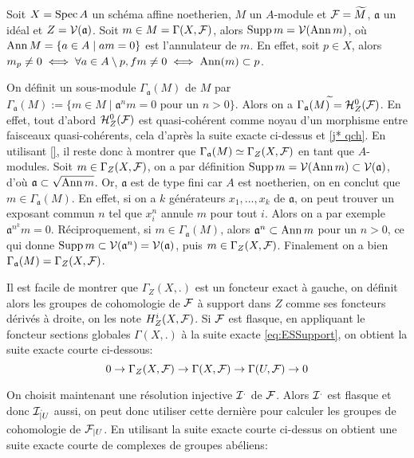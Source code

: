 \begin{ex}\label{cohomsupportaffineex}
Soit $X=\operatorname{Spec} A$ un schéma affine noetherien, $M$ un $A$-module et $\mathcal{F}=\widetilde{M}$, $\mathfrak{a}$ un idéal et $Z=\mathcal{V}(\mathfrak{a})$. Soit $m\in M=\Gamma(X,\mathcal{F})$, alors $\operatorname{Supp} m=\mathcal{V}(\operatorname{Ann} m)$, où $\operatorname{Ann} M=\lbrace a\in A\mid am=0\rbrace$ est l'annulateur de $m$. En effet, soit $p\in X$, alors $m_p\neq 0\iff \forall a\in A\setminus p, fm\neq 0\iff \operatorname{Ann}(m)\subset p$.

On définit un sous-module $\Gamma_\mathfrak{a}(M)$ de $M$ par $\Gamma_\mathfrak{a}(M):=\lbrace m\in M\mid \mathfrak{a}^nm=0 \text{ pour un } n>0 \rbrace$. Alors on a $\Gamma_\mathfrak{a}(M)^{\widetilde{}} = \mathcal{H} ^0 _Z(\mathcal{F})$. En effet, tout d'abord $\mathcal{H}^0 _Z(\mathcal{F})$ est quasi-cohérent comme noyau d'un morphisme entre faisceaux quasi-cohérents, cela d'après la suite exacte ci-dessus et \ref{j* qch}. En utilisant \ref{}, il reste donc à montrer que $\Gamma_\mathfrak{a}(M)\simeq\Gamma_Z(X,\mathcal{F})$ en tant que $A$-modules. Soit $m\in\Gamma_Z(X,\mathcal{F})$, on a par définition $\operatorname{Supp} m=\mathcal{V}(\operatorname{Ann} m)\subset \mathcal{V}(\mathfrak{a})$, d'où $\mathfrak{a}\subset \sqrt{\operatorname{Ann} m}$. Or, $\mathfrak{a}$ est de type fini car $A$ est noetherien, on en conclut que $m\in \Gamma_\mathfrak{a}(M)$. En effet, si on a $k$ générateurs $x_1,...,x_k$ de $\mathfrak{a}$, on peut trouver un exposant commun $n$ tel que $x^n_i$ annule $m$ pour tout $i$. Alors on a par exemple $\mathfrak{a}^{n^k}m=0$. Réciproquement, si $m\in \Gamma_\mathfrak{a}(M)$, alors $\mathfrak{a}^n\subset \operatorname{Ann} m$ pour un $n>0$, ce qui donne $\operatorname{Supp} m \subset\mathcal{V}(\mathfrak{a}^n)=\mathcal{V}(\mathfrak{a})$, puis $m\in \Gamma_Z(X,\mathcal{F})$. Finalement on a bien $\Gamma_\mathfrak{a}(M)=\Gamma_Z(X,\mathcal{F})$.
\end{ex}

Il est facile de montrer que $\Gamma_Z(X, .)$ est un foncteur exact à gauche, on définit alors les groupes de cohomologie de $\mathcal{F}$ à support dans $Z$ comme ses foncteurs dérivés à droite, on les note $H_Z^i(X,\mathcal{F})$. Si $\mathcal{F}$ est flasque, en appliquant le foncteur sections globales $\Gamma(X,.)$ à la suite exacte \ref{eq:ESSupport}, on obtient la suite exacte courte ci-dessous:
$$0\rightarrow \Gamma_Z(X,\mathcal{F})\rightarrow \Gamma(X,\mathcal{F})\rightarrow \Gamma(U,\mathcal{F})\rightarrow 0$$

On choisit maintenant une résolution injective $\mathcal{I}^.$ de $\mathcal{F}$. Alors $\mathcal{I}^.$ est flasque et donc $\mathcal{I}^._{|U}$ aussi, on peut donc utiliser cette dernière pour calculer les groupes de cohomologie de $\mathcal{F}_{|U}$.   En utilisant la suite exacte courte ci-dessus on obtient une suite exacte courte de complexes de groupes abéliens:

